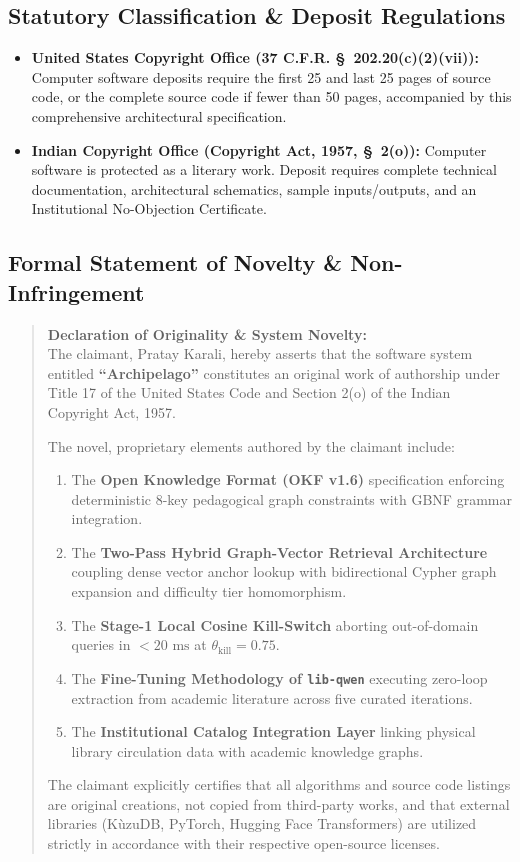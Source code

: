 \documentclass[10pt,a4paper]{article}
\begin{document}
\subsection{Statutory Classification \& Deposit Regulations}
\begin{itemize}\setlength{\itemsep}{1pt}\setlength{\parskip}{0pt}
\item \textbf{United States Copyright Office (37 C.F.R. \S\ 202.20(c)(2)(vii)):} Computer software deposits require the first 25 and last 25 pages of source code, or the complete source code if fewer than 50 pages, accompanied by this comprehensive architectural specification.
\item \textbf{Indian Copyright Office (Copyright Act, 1957, \S\ 2(o)):} Computer software is protected as a literary work. Deposit requires complete technical documentation, architectural schematics, sample inputs/outputs, and an Institutional No-Objection Certificate.
\end{itemize}

\subsection{Formal Statement of Novelty \& Non-Infringement}
\begin{quote}
\small
\textbf{Declaration of Originality \& System Novelty:} \\
The claimant, Pratay Karali, hereby asserts that the software system entitled \textbf{``Archipelago''} constitutes an original work of authorship under Title 17 of the United States Code and Section 2(o) of the Indian Copyright Act, 1957. 

The novel, proprietary elements authored by the claimant include:
\begin{enumerate}\setlength{\itemsep}{0pt}\setlength{\parskip}{0pt}
\item The \textbf{Open Knowledge Format (OKF v1.6)} specification enforcing deterministic 8-key pedagogical graph constraints with GBNF grammar integration.
\item The \textbf{Two-Pass Hybrid Graph-Vector Retrieval Architecture} coupling dense vector anchor lookup with bidirectional Cypher graph expansion and difficulty tier homomorphism.
\item The \textbf{Stage-1 Local Cosine Kill-Switch} aborting out-of-domain queries in $<20\text{ ms}$ at $\theta_{\text{kill}} = 0.75$.
\item The \textbf{Fine-Tuning Methodology of \texttt{lib-qwen}} executing zero-loop extraction from academic literature across five curated iterations.
\item The \textbf{Institutional Catalog Integration Layer} linking physical library circulation data with academic knowledge graphs.
\end{enumerate}
The claimant explicitly certifies that all algorithms and source code listings are original creations, not copied from third-party works, and that external libraries (K\`uzuDB, PyTorch, Hugging Face Transformers) are utilized strictly in accordance with their respective open-source licenses.
\end{quote}
\end{document}
